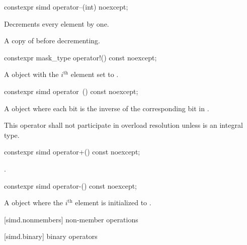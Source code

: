 \begin{itemdecl}
constexpr simd operator--(int) noexcept;
\end{itemdecl}

\begin{itemdescr}
  \pnum\effects
  Decrements every element by one.

  \pnum\returns
  A copy of  before decrementing.
\end{itemdescr}

\begin{itemdecl}
constexpr mask_type operator!() const noexcept;
\end{itemdecl}

\begin{itemdescr}
  \pnum\returns
  A  object with the $i^\text{th}$ element set to  \foralli.
\end{itemdescr}

\begin{itemdecl}
constexpr simd operator~() const noexcept;
\end{itemdecl}

\begin{itemdescr}
  \pnum\returns
  A  object where each bit is the inverse of the corresponding bit in .

  \pnum\remarks
  This operator shall not participate in overload resolution unless  is an integral type.
\end{itemdescr}

\begin{itemdecl}
constexpr simd operator+() const noexcept;
\end{itemdecl}

\begin{itemdescr}
  \pnum\returns
  .
\end{itemdescr}

\begin{itemdecl}
constexpr simd operator-() const noexcept;
\end{itemdecl}

\begin{itemdescr}
  \pnum\returns
  A  object where the $i^\text{th}$ element is initialized to  \foralli.
\end{itemdescr}

[simd.nonmembers]{ non-member operations}

[simd.binary]{ binary operators}

